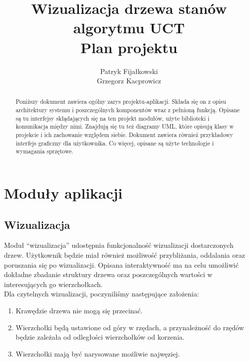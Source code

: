 \documentclass{article}
\title{
	Wizualizacja drzewa stanów algorytmu UCT \\
	\large Plan projektu}
\author{Patryk Fijałkowski \\ Grzegorz Kacprowicz}
\let\oldsection\section
\renewcommand\section{\clearpage\oldsection}
\begin{document}
	\begin{titlingpage}
		\maketitle
		\vspace{3cm}
		\begin{abstract}
			Poniższy dokument zawiera ogólny zarys projektu-aplikacji. Składa się on z opisu architektury systemu i poszczególnych komponentów wraz z pełnioną funkcją. Opisane są tu interfejsy skłądających się na ten projekt modułów, użyte biblioteki i komunikacja między nimi. Znajdują się tu też diagramy UML, które opisują klasy w projekcie i ich zachowanie względem siebie. Dokument zawiera również przykładowy interfejs graficzny dla użytkownika. Co więcej, opisane są użyte technologie i wymagania sprzętowe.
		\end{abstract}
	\end{titlingpage}

	\begin{versionhistory}
	\end{versionhistory}
	
	\tableofcontents	
	\section{Moduły aplikacji}
	\subsection{Wizualizacja}
	Moduł ``wizualizacja'' udostępnia funkcjonalność wizualizacji dostarczonych drzew. Użytkownik będzie miał również możliwość przybliżania, oddalania oraz poruszania się po wizualizacji. Opisana interaktywność ma na celu umożliwić dokładne zbadanie struktury drzewa oraz poszczególnych wartości w interesujących go wierzchołkach. \\
	
	\noindent Dla czytelnych wizualizacji, poczyniliśmy następujące założenia: \\
	
	\begin{enumerate}
		\item Krawędzie drzewa nie mogą się przecinać.
		\item Wierzchołki będą ustawione od góry w rzędach, a przynależność do
		rzędów będzie zależała od odległości wierzchołków od korzenia.
		\item Wierzchołki mają być narysowane możliwie najwęziej.  \\
	\end{enumerate}
\end{document}
